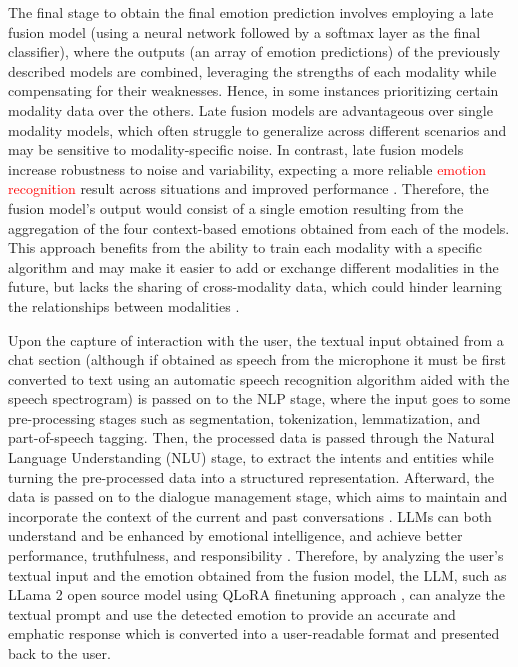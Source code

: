 \documentclass[runningheads]{llncs}
\begin{document}
The final stage to obtain the final emotion prediction involves employing a late fusion model (using a neural network followed by a softmax layer as the final classifier), where the outputs (an array of emotion predictions) of the previously described models are combined, leveraging the strengths of each modality while compensating for their weaknesses. Hence, in some instances prioritizing certain modality data over the others. Late fusion models are advantageous over single modality models, which often struggle to generalize across different scenarios and may be sensitive to modality-specific noise. In contrast, late fusion models increase robustness to noise and variability, expecting a more reliable \textcolor{red}{emotion recognition} result across situations and improved performance \cite{zhu_multimodal_2023, sleeman_multimodal_2022}. Therefore, the fusion model's output would consist of a single emotion resulting from the aggregation of the four context-based emotions obtained from each of the models. This approach benefits from the ability to train each modality with a specific algorithm and may make it easier to add or exchange different modalities in the future, but lacks the sharing of cross-modality data, which could hinder learning the relationships between modalities \cite{sleeman_multimodal_2022}.


Upon the capture of interaction with the user, the textual input obtained from a chat section (although if obtained as speech from the microphone it must be first converted to text using an automatic speech recognition algorithm aided with the speech spectrogram) is passed on to the NLP stage, where the input goes to some pre-processing stages such as segmentation, tokenization, lemmatization, and part-of-speech tagging. Then, the processed data is passed through the Natural Language Understanding (NLU) stage, to extract the intents and entities while turning the pre-processed data into a structured representation. Afterward, the data is passed on to the dialogue management stage, which aims to maintain and incorporate the context of the current and past conversations \cite{rizou_multilingual_2022}. LLMs can both understand and be enhanced by emotional intelligence, and achieve better performance, truthfulness, and responsibility \cite{li_large_2023}. Therefore, by analyzing the user's textual input and the emotion obtained from the fusion model, the LLM, such as LLama 2 open source model using QLoRA finetuning approach \cite{Dettmers2023}, can analyze the textual prompt and use the detected emotion to provide an accurate and emphatic response which is converted into a user-readable format and presented back to the user.
\end{document}
